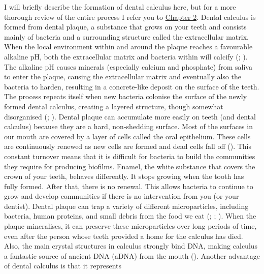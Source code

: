 \documentclass[
  b5paper,
]{book}
\begin{document}
I will briefly describe the formation of dental calculus here, but for a
more thorough review of the entire process I refer you to
\hyperref[chap-background]{Chapter 2}. Dental calculus is formed from
dental plaque, a substance that grows on your teeth and consists mainly
of bacteria and a surrounding structure called the extracellular matrix.
When the local environment within and around the plaque reaches a
favourable alkaline pH, both the extracellular matrix and bacteria
within will calcify (; ).
The alkaline pH causes minerals (especially calcium and phosphate) from
saliva to enter the plaque, causing the extracellular matrix and
eventually also the bacteria to harden, resulting in a concrete-like
deposit on the surface of the teeth. The process repeats itself when new
bacteria colonise the surface of the newly formed dental calculus,
creating a layered structure, though somewhat disorganised
(;
). Dental
plaque can accumulate more easily on teeth (and dental calculus) because
they are a hard, non-shedding surface. Most of the surfaces in our mouth
are covered by a layer of cells called the oral epithelium. These cells
are continuously renewed as new cells are formed and dead cells fall off
(). This
constant turnover means that it is difficult for bacteria to build the
communities they require for producing biofilms. Enamel, the white
substance that covers the crown of your teeth, behaves differently. It
stops growing when the tooth has fully formed. After that, there is no
renewal. This allows bacteria to continue to grow and develop
communities if there is no intervention from you (or your dentist).
Dental plaque can trap a variety of different microparticles, including
bacteria, human proteins, and small debris from the food we eat
(;
;
). When the
plaque mineralises, it can preserve these microparticles over long
periods of time, even after the person whose teeth provided a home for
the calculus has died. Also, the main crystal structures in calculus
strongly bind DNA, making calculus a fantastic source of ancient DNA
(aDNA) from the mouth (). Another advantage of dental calculus is that it represents
\end{document}
